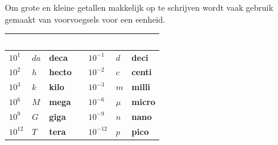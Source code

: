 \documentclass{ximera}
\begin{document}
Om grote en kleine getallen makkelijk op te schrijven wordt vaak gebruik gemaakt van voorvoegsels voor een eenheid.  \\
\begin{center}
%
\renewcommand{\arraystretch}{1.5}
{}
\begin{tabular}{|l|l|l|l|l|l|l|} 
\hline
\multicolumn{7}{|c|}{{\cellcolor{black}}\textcolor{white}{\textbf{Veelvouden}}\textcolor{white}{}\textcolor{white}{}}                  \\ 
\hline
\textbf{$10^1$}                                 & \textbf{$da$}                                 & \textbf{deca}                                  &   & {\cellcolor[rgb]{0,0.502,0.502}}\textbf{$10^{-1}$}  & {\cellcolor[rgb]{0,0.502,0.502}}\textbf{$d$} & {\cellcolor[rgb]{0,0.502,0.502}}\textbf{deci}    \\ 
\hline
\textbf{$10^2$}                                 & \textbf{$h$}                              & \textbf{hecto}                                 &   & {\cellcolor[rgb]{0,0.502,0.502}}\textbf{$10^{-2}$}  & {\cellcolor[rgb]{0,0.502,0.502}}\textbf{$c$} & {\cellcolor[rgb]{0,0.502,0.502}}\textbf{centi}   \\ 
\hline
{\cellcolor[rgb]{0,0.502,0.502}}\textbf{$10^3$} & {\cellcolor[rgb]{0,0.502,0.502}}\textbf{$k$} & {\cellcolor[rgb]{0,0.502,0.502}}\textbf{kilo}  &   & {\cellcolor[rgb]{0,0.502,0.502}}\textbf{}$10^{-3}$ & {\cellcolor[rgb]{0,0.502,0.502}}\textbf{$m$} & {\cellcolor[rgb]{0,0.502,0.502}}\textbf{milli}   \\ 
\hline
{\cellcolor[rgb]{0,0.502,0.502}}\textbf{$10^6$}  & {\cellcolor[rgb]{0,0.502,0.502}}\textbf{$M$} & {\cellcolor[rgb]{0,0.502,0.502}}\textbf{mega}  &   & {\cellcolor[rgb]{0,0.502,0.502}}\textbf{}$10^{-6}$ & {\cellcolor[rgb]{0,0.502,0.502}}$\mu$          & {\cellcolor[rgb]{0,0.502,0.502}}\textbf{micro}   \\ 
\hline
{\cellcolor[rgb]{0,0.502,0.502}}\textbf{$10^9$} & {\cellcolor[rgb]{0,0.502,0.502}}\textbf{$G$} & {\cellcolor[rgb]{0,0.502,0.502}}\textbf{giga}  &   & {\cellcolor[rgb]{0,0.502,0.502}}\textbf{}$10^{-9}$ & {\cellcolor[rgb]{0,0.502,0.502}}\textbf{$n$}  & {\cellcolor[rgb]{0,0.502,0.502}}\textbf{nano}    \\ 
\hline
\textbf{$10^{12}$}                             & \textbf{$T$}                                & \textbf{tera}                                  &   & \textbf{$10^{-12}$  }                              & \textbf{$p$}                                 & \textbf{pico}                                    \\ 

\end{tabular}
\end{center}
\end{document}
